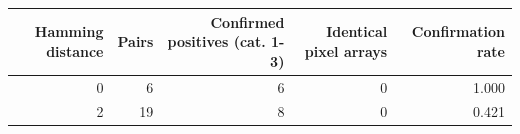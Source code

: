 \begin{tabular}{rrrrr}
\toprule
Hamming distance & Pairs & Confirmed positives (cat. 1-3) & Identical pixel arrays & Confirmation rate \\
\midrule
0 & 6 & 6 & 0 & 1.000 \\
2 & 19 & 8 & 0 & 0.421 \\
\bottomrule
\end{tabular}
